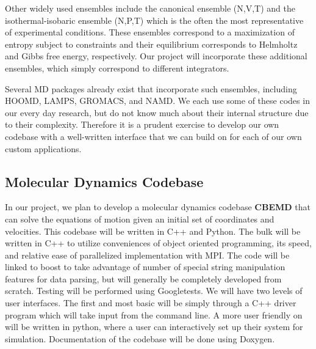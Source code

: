 \documentclass[10pt]{article}
\begin{document}
Other widely used ensembles include the canonical ensemble (N,V,T) and the isothermal-isobaric ensemble (N,P,T) which is the often the most representative of experimental conditions.
These ensembles correspond to a maximization of entropy subject to constraints and their equilibrium corresponds to Helmholtz and Gibbs free energy, respectively.  Our project will incorporate these additional ensembles, which simply correspond to different integrators.

Several MD packages already exist that incorporate such ensembles, including HOOMD, LAMPS, GROMACS, and NAMD. We each use some of these codes in our every day research, but do not know much about their internal structure due to their complexity. Therefore it is a prudent exercise to develop our own codebase with a well-written interface that we can build on for each of our own custom applications.

\subsection{Molecular Dynamics Codebase}
In our project, we plan to develop a molecular dynamics codebase \textbf{CBEMD} that can solve the equations of motion given an initial set of coordinates and velocities. This codebase will be written in C++ and Python. The bulk will be written in C++ to utilize conveniences of object oriented programming, its speed, and relative ease of parallelized implementation with MPI.  The code will be linked to boost to take advantage of number of special string manipulation features for data parsing, but will generally be completely developed from scratch. Testing will be performed using Googletests. We will have two levels of user interfaces.  The first and most basic will be simply through a C++ driver program which will take input from the command line.  A more user friendly on will be written in python, where a user can interactively set up their system for simulation. Documentation of the codebase will be done using Doxygen.


\end{document}
